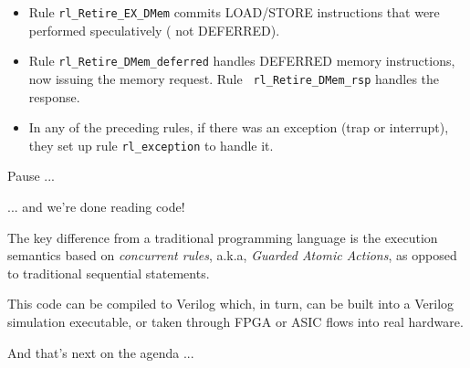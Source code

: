 \begin{frame}[fragile]
\begin{center}
\begin{minipage}{0.9\textwidth}
\begin{itemize}
    \item Rule {\tt rl\_Retire\_EX\_DMem} commits LOAD/STORE
      instructions that were performed speculatively ({\ie} not
      DEFERRED).

    \item Rule {\tt rl\_Retire\_DMem\_deferred} handles DEFERRED
      memory instructions, now issuing the memory request.  Rule {\tt
      rl\_Retire\_DMem\_rsp} handles the response.

    \item In any of the preceding rules, if there was an exception
      (trap or interrupt), they set up rule {\tt rl\_exception} to
      handle it.

  \end{itemize}
 \end{minipage}
\end{center}

\end{frame}


\begin{frame}[fragile]

\begin{center}
  {\LARGE Pause ...}

 \vspace*{8ex}

 \begin{minipage}{0.8\textwidth}

   ... and we're done reading {\FIFE} code!    

   \vspace*{2ex}

   {\scriptsize The key difference from a traditional programming
   language is the execution semantics based on \emph{concurrent
   rules}, a.k.a, \emph{Guarded Atomic Actions}, as opposed to
   traditional sequential statements.}

   \vspace*{10ex}

   This code can be compiled to Verilog which, in turn, can be built
   into a Verilog simulation executable, or taken through FPGA or ASIC
   flows into real hardware.

 \end{minipage}

 \vspace*{5ex}

 And that's next on the agenda ...

\end{center}

\end{frame}

